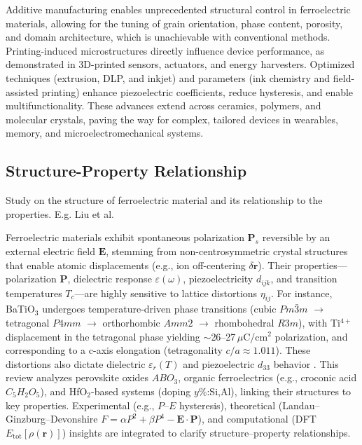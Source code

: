 \documentclass[a4paper,fleqn]{cas-sc}
\begin{document}
\par Additive manufacturing enables unprecedented structural control in ferroelectric materials, allowing for the tuning of grain orientation, phase content, porosity, and domain architecture, which is unachievable with conventional methods. Printing-induced microstructures directly influence device performance, as demonstrated in 3D-printed sensors, actuators, and energy harvesters. Optimized techniques (extrusion, DLP, and inkjet) and parameters (ink chemistry and field-assisted printing) enhance piezoelectric coefficients, reduce hysteresis, and enable multifunctionality. These advances extend across ceramics, polymers, and molecular crystals, paving the way for complex, tailored devices in wearables, memory, and microelectromechanical systems.

\subsection{Structure-Property Relationship} \label{SP}
Study on the structure of ferroelectric material and its relationship to the properties. E.g. Liu et al. ~\cite{Liu2022-NMI}
\par Ferroelectric materials exhibit spontaneous polarization \( \mathbf{P}_s \) reversible by an external electric field \( \mathbf{E} \), stemming from non-centrosymmetric crystal structures that enable atomic displacements (e.g., ion off-centering \( \delta\mathbf{r} \)). Their properties—polarization \( \mathbf{P} \), dielectric response \( \varepsilon(\omega) \), piezoelectricity \( d_{ijk} \), and transition temperatures \( T_c \)—are highly sensitive to lattice distortions \( \eta_{ij} \). For instance, BaTiO\(_3\) undergoes temperature-driven phase transitions (cubic \( Pm\bar{3}m \) \(\rightarrow\) tetragonal \( P4mm \) \(\rightarrow\) orthorhombic \( Amm2 \) \(\rightarrow\) rhombohedral \( R3m \)), with Ti\(^{4+}\) displacement in the tetragonal phase yielding \( \sim\!\)26–27\,\(\mu\)C/cm\(^2\) polarization, and corresponding to a c-axis elongation (tetragonality \( c/a \approx 1.011 \)). These distortions also dictate dielectric \( \varepsilon_r(T) \) and piezoelectric \( d_{33} \) behavior \cite{aslla2021role}. This review analyzes perovskite oxides \( ABO_3 \), organic ferroelectrics (e.g., croconic acid \( C_5H_2O_5 \)), and HfO\(_2\)-based systems (doping \( y\% \):Si,Al), linking their structures to key properties. Experimental (e.g., \( P \)–\( E \) hysteresis), theoretical (Landau–Ginzburg–Devonshire \( F = \alpha P^2 + \beta P^4 - \mathbf{E}\cdot\mathbf{P} \)), and computational (DFT \( E_{\text{tot}}[\rho(\mathbf{r})] \)) insights are integrated to clarify structure–property relationships.
\end{document}
